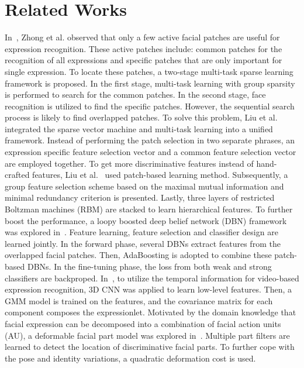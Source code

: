 \documentclass[a4paper, 10pt, conference]{ieeeconf}      %
\begin{document}
\section{Related Works}
In~\cite{zhong2012learning}, Zhong et al. observed that only a few active facial patches are useful for expression recognition. These active patches include: common patches for the recognition of all expressions and specific patches that are only important for single expression. To locate these patches, a two-stage multi-task sparse learning framework is proposed. In the first stage, multi-task learning with group sparsity is performed to search for the common patches. In the second stage, face recognition is utilized to find the specific patches. However, the sequential search process is likely to find overlapped patches. To solve this problem, Liu et al.~\cite{liu2014feature} integrated the sparse vector machine and multi-task learning into a unified framework. Instead of performing the patch selection in two separate phrases, an expression specific feature selection vector and a common feature selection vector are employed together. 
To get more discriminative features instead of hand-crafted features, Liu et al.~\cite{liu2013aware} used patch-based learning method. Subsequently, a group feature selection scheme based on the maximal mutual information and minimal redundancy criterion is presented. 
Lastly, three layers of restricted Boltzman machines (RBM) are stacked to learn hierarchical features.
To further boost the performance, a loopy boosted deep belief network (DBN) framework was explored in~\cite{liu2014facial}. Feature learning, feature selection and classifier design are learned jointly. In the forward phase, several DBNs extract features from the overlapped facial patches. Then, AdaBoosting is adopted to combine these patch-based DBNs. In the fine-tuning phase, the loss from both weak and strong classifiers are backproped. 
In~\cite{liu2014learning}, to utilize the temporal information for video-based expression recognition, 3D CNN was applied to learn low-level features. Then, a GMM model is trained on the features, and the covariance matrix for each component composes the expressionlet. 
Motivated by the domain knowledge that facial expression can be decomposed into a combination of facial action units (AU), a deformable facial part model was explored in~\cite{liu2014deeply}. 
Multiple part filters are learned to detect the location of discriminative facial parts. To further cope with the pose and identity variations, a quadratic deformation cost is used.
\end{document}
